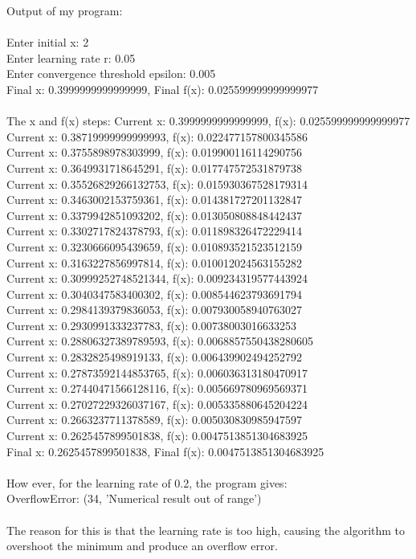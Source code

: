 \documentclass{article}
\begin{document}
Output of my program:\\
\\
Enter initial x: 2\\
Enter learning rate r: 0.05\\
Enter convergence threshold epsilon: 0.005\\
Final x: 0.3999999999999999, Final f(x): 0.025599999999999977\\
\\
The x and f(x) steps:
Current x: 0.3999999999999999, f(x): 0.025599999999999977\\
Current x: 0.38719999999999993, f(x): 0.022477157800345586\\
Current x: 0.3755898978303999, f(x): 0.019900116114290756\\
Current x: 0.3649931718645291, f(x): 0.017747572531879738\\
Current x: 0.35526829266132753, f(x): 0.015930367528179314\\
Current x: 0.3463002153759361, f(x): 0.014381727201132847\\
Current x: 0.3379942851093202, f(x): 0.013050808848442437\\
Current x: 0.3302717824378793, f(x): 0.011898326472229414\\
Current x: 0.3230666095439659, f(x): 0.010893521523512159\\
Current x: 0.3163227856997814, f(x): 0.010012024563155282\\
Current x: 0.30999252748521344, f(x): 0.009234319577443924\\
Current x: 0.3040347583400302, f(x): 0.008544623793691794\\
Current x: 0.2984139379836053, f(x): 0.007930058940763027\\
Current x: 0.2930991333237783, f(x): 0.00738003016633253\\
Current x: 0.28806327389789593, f(x): 0.0068857550438280605\\
Current x: 0.2832825498919133, f(x): 0.006439902494252792\\
Current x: 0.27873592144853765, f(x): 0.006036313180470917\\
Current x: 0.27440471566128116, f(x): 0.005669780969569371\\
Current x: 0.27027229326037167, f(x): 0.005335880645204224\\
Current x: 0.2663237711378589, f(x): 0.005030830985947597\\
Current x: 0.2625457899501838, f(x): 0.0047513851304683925\\
Final x: 0.2625457899501838, Final f(x): 0.0047513851304683925\\
\\
How ever, for the learning rate of 0.2, the program gives:\\
OverflowError: (34, 'Numerical result out of range')\\
\\
The reason for this is that the learning rate is too high, causing the algorithm to overshoot the minimum and produce an overflow error.
\end{document}
